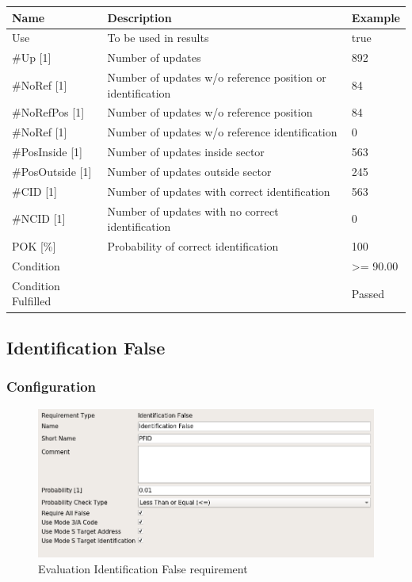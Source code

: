 \begin{center}
 \begin{table}[H]
  \begin{tabularx}{\textwidth}{ | l | X |  l | }
    \hline
    \textbf{Name} & \textbf{Description} & \textbf{Example} \\ \hline
    Use & To be used in results & true \\ \hline
    \#Up [1] & Number of updates & 892 \\ \hline
    \#NoRef [1] & Number of updates w/o reference position or identification & 84 \\ \hline
    \#NoRefPos [1] & Number of updates w/o reference position  & 84 \\ \hline
    \#NoRef [1] & Number of updates w/o reference identification & 0 \\ \hline
    \#PosInside [1] & Number of updates inside sector & 563 \\ \hline
    \#PosOutside [1] & Number of updates outside sector & 245 \\ \hline
    \#CID [1] & Number of updates with correct identification & 563 \\ \hline
    \#NCID [1] & Number of updates with no correct identification & 0 \\ \hline
    POK [\%] & Probability of correct identification & 100 \\ \hline
    Condition &  & >= 90.00 \\ \hline
    Condition Fulfilled &  & Passed \\ \hline
\end{tabularx}
\end{table}
\end{center}

\subsection{Identification False}
\label{sec:eval_req_id_false} 

\subsubsection{Configuration}

\begin{figure}[H]
    \includegraphics[width=14cm,frame]{../screenshots/eval_req_id_false.png}
  \caption{Evaluation Identification False requirement}
\end{figure}

